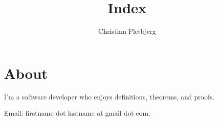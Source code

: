 \documentclass{article}
\title{Index}
\author{Christian Pletbjerg}
\begin{document}
\section{About}
I'm a software developer who enjoys definitions, theorems, and proofs.

Email: firstname dot lastname at gmail dot com.

\end{document}
